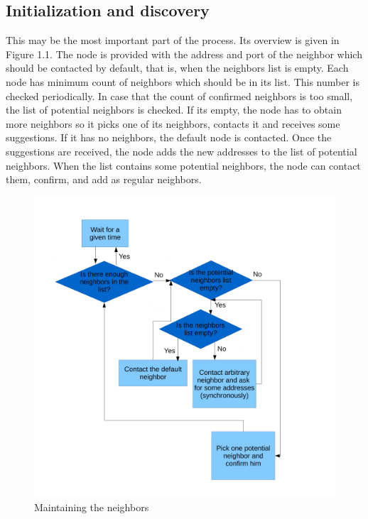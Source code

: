 \subsection*{Initialization and discovery}

This may be the most important part of the process. Its overview is
given in Figure 1.1. The node is provided with the address and port of
the neighbor which should be contacted by default, that is, when the
neighbors list is empty. Each node has minimum count of neighbors which
should be in its list. This number is checked periodically. In case that
the count of confirmed neighbors is too small, the list of potential
neighbors is checked. If its empty, the node has to obtain more
neighbors so it picks one of its neighbors, contacts it and receives
some suggestions. If it has no neighbors, the default node is contacted.
Once the suggestions are received, the node adds the new addresses to
the list of potential neighbors. When the list contains some potential
neighbors, the node can contact them, confirm, and add as regular
neighbors.

\begin{figure}[h]
\begin{center}
\includegraphics[scale=0.40]{./img/workflow_neighbors.pdf}
\caption{Maintaining the neighbors}
\end{center}
\end{figure}

